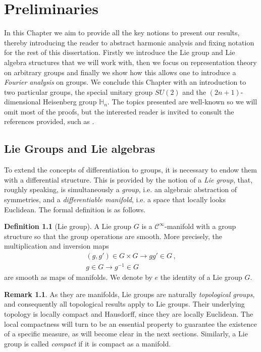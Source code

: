 \documentclass[12pt,oneside,a4paper]{book}
\numberwithin{equation}{section}     %
\theoremstyle{plain}
\theoremstyle{definition}
\newtheorem{definition}[theorem]{Definition}
\newtheorem{remark}[theorem]{Remark}
\begin{document}

\chapter{Preliminaries}\label{CP:2}

In this Chapter we aim to provide all the key notions to present our results, thereby introducing the reader to abstract harmonic analysis and fixing notation for the rest of this dissertation. Firstly we introduce the Lie group and Lie algebra structures that we will work with, then we focus on representation theory on arbitrary groups and finally we show how this allows one to introduce a \textit{Fourier analysis} on groups. We conclude this Chapter with an introduction to two particular groups, the special unitary group $SU(2)$ and the $(2n+1)$-dimensional Heisenberg group $\mathbb {H}_n$. The topics presented are well-known so we will omit most of the proofs, but the interested reader is invited to consult the references provided, such as \cite{CG90,Fol,FR2016,H2003,R2001,T1986}.

\section{Lie Groups and Lie algebras}
To extend the concepts of differentiation to groups, it is necessary to endow them with a differential structure. This is provided by the notion of a \textit{Lie group}, that, roughly speaking, is simultaneously a \textit{group}, i.e. an algebraic abstraction of symmetries, and a  \textit{differentiable manifold}, i.e. a space that locally looks Euclidean. The formal definition is as follows.

\begin{definition}[Lie group]
	A Lie group $G$ is a $\mathcal{C}^\infty$-manifold with a group structure so that the group operations are smooth. More precisely, the multiplication and inversion maps
	\begin{align*}
	(g,g')\in G\times G\rightarrow gg'\in G\,,\\
	g\in G\rightarrow g^{-1}\in G
	\end{align*}
	are smooth as maps of manifolds. We denote by $e$ the identity of a Lie group $G$.
\end{definition}
\begin{remark}
	As they are manifolds, Lie groups are naturally \textit{topological groups}, and consequently all topological results apply to Lie groups. Their underlying topology is locally compact and Hausdorff, since they are locally Euclidean. The local compactness will turn to be an essential property to guarantee the existence of a specific measure, as will become clear in the next sections. Similarly, a Lie group is called \textit{compact} if it is compact as a manifold.
\end{remark}
\end{document}
